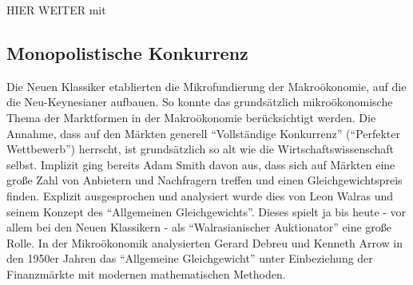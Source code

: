 HIER WEITER mit
\textcite{Okun1975}
\textcite{Stiglitz1984}
\textcite{Rotemberg1986}
\textcite{Rotemberg1991}



\subsection{Monopolistische Konkurrenz}
\label{Monopol}
Die Neuen Klassiker etablierten die Mikrofundierung der Makroökonomie, auf die die Neu-Keynesianer aufbauen. So konnte das grundsätzlich mikroökonomische Thema der Marktformen in der Makroökonomie berücksichtigt werden. Die Annahme, dass auf den Märkten generell "`Vollständige Konkurrenz"' ("`Perfekter Wettbewerb"') herrscht, ist grundsätzlich so alt wie die Wirtschaftswissenschaft selbst. Implizit ging bereits Adam Smith davon aus, dass sich auf Märkten eine große Zahl von Anbietern und Nachfragern treffen und einen Gleichgewichtspreis finden. Explizit ausgesprochen und analysiert wurde dies von Leon Walras und seinem Konzept des "`Allgemeinen Gleichgewichts"'. Dieses spielt ja bis heute - vor allem bei den Neuen Klassikern - als "`Walrasianischer Auktionator"' eine große Rolle. In der Mikroökonomik analysierten Gerard Debreu und Kenneth Arrow in den 1950er Jahren das "`Allgemeine Gleichgewicht"' unter Einbeziehung der Finanzmärkte mit modernen mathematischen Methoden. 
